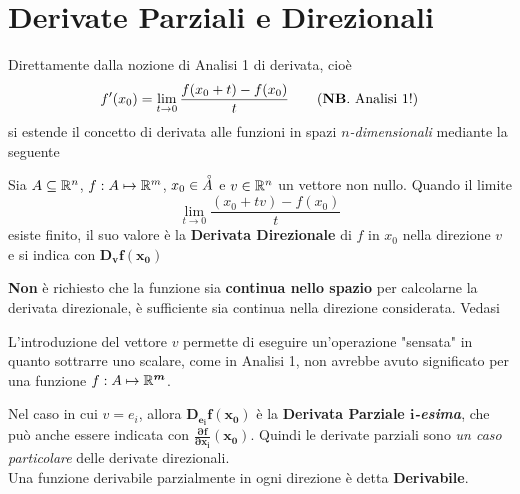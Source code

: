 \section{Derivate Parziali e Direzionali}
Direttamente dalla nozione di Analisi 1 di derivata, cioè
\begin{align*}
	f'(x_0) = \lim\limits_{t \to 0} \frac{f(x_0 + t) - f(x_0)}{t} \tag{\textbf{NB}. Analisi 1!}
\end{align*}
si estende il concetto di derivata alle funzioni in spazi $n$\textit{-dimensionali} mediante la seguente
\begin{definition}
	\label{def:deriv_direz}
	Sia $A \subseteq \mathbb{R}^n$, $f: A \mapsto \mathbb{R}^m$, $x_0 \in \accentset{\circ}{A}$ e $v \in \mathbb{R}^n$ un vettore non nullo. Quando il limite
	\[\lim\limits_{t \to 0} \frac{(x_0 + tv) - f(x_0)}{t}\]
	esiste finito, il suo valore è la \textbf{Derivata Direzionale} di $f$ in $x_0$ nella direzione $v$ e si indica con $\boldsymbol{D_v f(x_0)}$
	\begin{note}
		\textbf{Non} è richiesto che la funzione sia \textbf{continua nello spazio} per calcolarne la derivata direzionale, è sufficiente sia continua nella direzione considerata. Vedasi 
	\end{note}
	\begin{note}
		L'introduzione del vettore $v$ permette di eseguire un'operazione "sensata" in quanto sottrarre uno scalare, come in Analisi 1, non avrebbe avuto significato per una funzione $f: A \mapsto \mathbb{R}^{\boldsymbol{m}}$.
	\end{note}

	Nel caso in cui $v = e_i$, allora $\boldsymbol{D_{e_i} f(x_0)}$ è la \textbf{Derivata Parziale $\boldsymbol{i}$\textit{-esima}}, che può anche essere indicata con $\boldsymbol{\frac{\partial f}{\partial x_i}(x_0)}$. Quindi le derivate parziali sono \textit{un caso particolare} delle derivate direzionali.\\

	\noindent Una funzione derivabile parzialmente in ogni direzione è detta \textbf{Derivabile}.


\end{definition}
